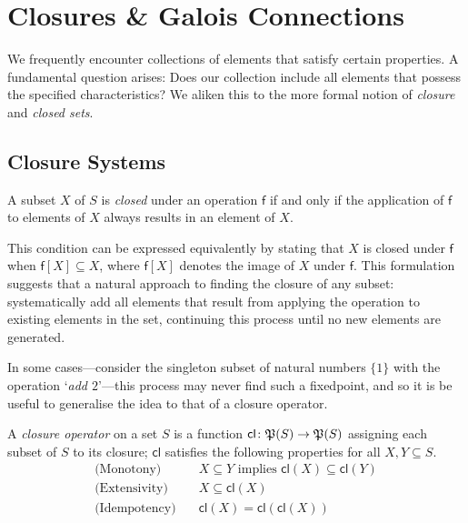 \section{Closures \& Galois Connections}
\label{section:closure-systems}

We frequently encounter collections of elements that satisfy certain properties. A fundamental question arises: Does our collection include all elements that possess the specified characteristics? We aliken this to the more formal notion of \textit{closure} and \textit{closed sets}.

\subsection{Closure Systems}

\begin{definition}
\label{definition:closed-set}
	A subset $X$ of $S$ is \textit{closed} under an operation $\mathsf{f}$ if and only if the application of $\mathsf{f}$ to elements of $X$ always results in an element of $X$.
\end{definition}

This condition can be expressed equivalently by stating that $X$ is closed under $\mathsf{f}$ when $\mathsf{f}[X] \subseteq X$, where $\mathsf{f}[X]$ denotes the image of $X$ under $\mathsf{f}$. This formulation suggests that a natural approach to finding the closure of any subset: systematically add all elements that result from applying the operation to existing elements in the set, continuing this process until no new elements are generated.

In some cases---consider the singleton subset of natural numbers $\{1\}$ with the operation `\textit{add $2$}'---this process may never find such a fixedpoint, and so it is be useful to generalise the idea to that of a closure operator.

\begin{definition}
\label{definition:closure-operator}
	A \emph{closure operator} on a set $S$ is a function $\mathsf{cl} \colon \mathfrak{P}({S}) \to \mathfrak{P}({S})$ assigning each subset of $S$ to its closure; $\mathsf{cl}$ satisfies the following properties for all $X,Y \subseteq S$.
	\begin{align}
    \text{(Monotony)} \quad & X \subseteq Y \text{ implies } \mathsf{cl}(X) \subseteq \mathsf{cl} (Y) \\
    \text{(Extensivity)} \quad & X \subseteq \mathsf{cl} (X) \\
    \text{(Idempotency)} \quad & \mathsf{cl} (X) = \mathsf{cl}(\mathsf{cl}(X))
  \end{align}
\end{definition}

